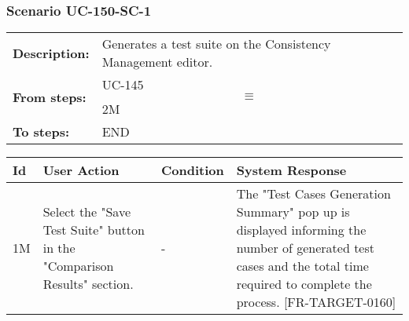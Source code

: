 \documentclass[a4paper,11pt]{article}
\newcommand{\bl}{\\ \hline}
\begin{document}
\subsubsection*{Scenario UC-150-SC-1}
\begin{tabular}{p{1in}p{4in}}
{\bf Description:} & Generates a test suite on the Consistency Management editor. \\
{\bf From steps:} & UC-145$$\equiv$$2M \\
{\bf To steps:} & END \\
\end{tabular}
 
\begin{tabular}{|p{0.8in}|p{1.6in}|p{1.6in}|p{1.6in}|}
\hline
Id & User Action & Condition & System Response  \bl 
1M & Select the "Save Test Suite" button in the "Comparison Results" section. & - & The "Test Cases Generation Summary" pop up is displayed informing the number of generated test cases and the total time required to complete the process. [FR-TARGET-0160] \bl 
\end{tabular}
\end{document}
